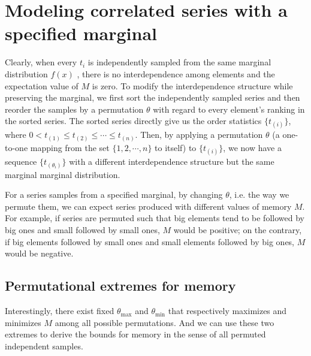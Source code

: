 \section{Modeling correlated series with a specified marginal}
Clearly, when every $ t_{i} $ is independently sampled from the same marginal distribution $ f(x) $ , there is no interdependence among elements and the expectation value of $ M $ is zero. To modify the interdependence structure while preserving the marginal, we first sort the independently sampled series and then reorder the samples by a permutation $ \theta $ with regard to every element's ranking in the sorted series.
The sorted series directly give us the order statistics $ \{t_{(i)}\} $, 
where $ 0 < t_{(1)} \leq t_{(2)} \leq \cdots \leq t_{(n)} $.  
Then, by applying a permutation $ \theta $ (a one-to-one mapping from the set $ \{1, 2, \cdots, n\} $ to itself) to $ \{t_{(i)}\} $, we now have a sequence $ \{t_{(\theta_{i})}\} $ with a different interdependence structure but the same marginal marginal distribution. 

For a series samples from a specified marginal, by changing $ \theta $, i.e. the way we permute them, we can expect series produced with different values of memory $ M $. For example, if series are permuted such that big elements tend to be followed by big ones and small followed by small ones, $ M $ would be positive; on the contrary, if big elements followed by small ones and small elements followed by big ones, $ M $ would be negative. 

\subsection{Permutational extremes for memory}
Interestingly, there exist fixed $ \theta_{\max} $ and $ \theta_{\min} $ that respectively maximizes and minimizes $ M $ among all possible permutations. And we can use these two extremes to derive the bounds for memory in the sense of all permuted independent samples.

